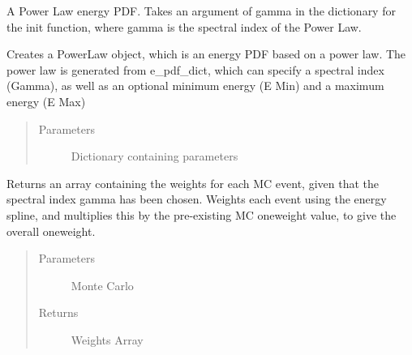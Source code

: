 \documentclass[letterpaper,10pt,english]{sphinxmanual}
\begin{document}
\begin{fulllineitems}
\label{\detokenize{index:flarestack.core.energy_pdf.Spline}}
A Power Law energy PDF. Takes an argument of gamma in the dictionary
for the init function, where gamma is the spectral index of the Power Law.

\begin{fulllineitems}
\label{\detokenize{index:flarestack.core.energy_pdf.Spline.__init__}}
Creates a PowerLaw object, which is an energy PDF based on a power
law. The power law is generated from e\_pdf\_dict, which can specify a
spectral index (Gamma), as well as an optional minimum energy (E Min)
and a maximum energy (E Max)
\begin{quote}\begin{description}
\item[{Parameters}] \leavevmode
{} \textendash{} Dictionary containing parameters

\end{description}\end{quote}

\end{fulllineitems}


\begin{fulllineitems}
\label{\detokenize{index:flarestack.core.energy_pdf.Spline.weight_mc}}
Returns an array containing the weights for each MC event,
given that the spectral index gamma has been chosen. Weights each
event using the energy spline, and multiplies this by the
pre-existing MC oneweight value, to give the overall oneweight.
\begin{quote}\begin{description}
\item[{Parameters}] \leavevmode
{} \textendash{} Monte Carlo

\item[{Returns}] \leavevmode
Weights Array

\end{description}\end{quote}

\end{fulllineitems}


\end{fulllineitems}
\end{document}

